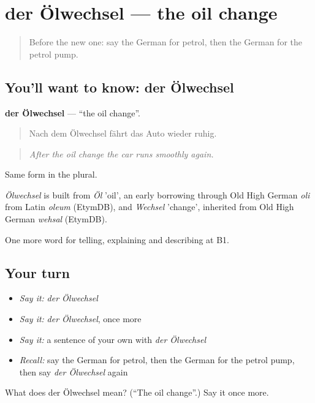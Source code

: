 \section[der Ölwechsel]{der Ölwechsel — the oil change}

\label{lesson:GE-C402-oelwechsel}



\begin{quote}
Before the new one: say the German for petrol, then the German for the petrol pump.
\end{quote}

\subsection*{You'll want to know: der Ölwechsel}
\textbf{der Ölwechsel} — \textquotedblleft{}the oil change\textquotedblright{}.

\begin{quote}
Nach dem Ölwechsel fährt das Auto wieder ruhig.
\end{quote}

\begin{quote}
\emph{After the oil change the car runs smoothly again.}
\end{quote}

Same form in the plural.

\begin{cousinweb}
\emph{Ölwechsel} is built from \emph{Öl} 'oil', an early borrowing through Old High German \emph{oli} from Latin \emph{oleum} (EtymDB), and \emph{Wechsel} 'change', inherited from Old High German \emph{wehsal} (EtymDB).
\end{cousinweb}

\begin{grammarlens}[title={What you've built}]
One more word for telling, explaining and describing at B1.
\end{grammarlens}

\subsection*{Your turn}
\begin{itemize}
\raggedright
  \item \emph{Say it:} \emph{der Ölwechsel}
  \item \emph{Say it:} \emph{der Ölwechsel}, once more
  \item \emph{Say it:} a sentence of your own with \emph{der Ölwechsel}
  \item \emph{Recall:} say the German for petrol, then the German for the petrol pump, then say \emph{der Ölwechsel} again
\end{itemize}

\begin{tcolorbox}[breakable,colback=teal!4,colframe=teal!35!black,title={Before you move on}]
What does der Ölwechsel mean? (\textquotedblleft{}The oil change\textquotedblright{}.) Say it once more.
\end{tcolorbox}
